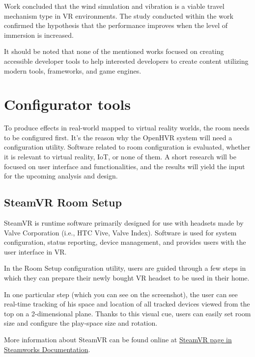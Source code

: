 Work concluded that the wind simulation and vibration is a viable travel
mechanism type in VR environments. The study conducted within
the work confirmed the hypothesis that the performance improves when the level of
immersion is increased.

\vspace{2em}

It should be noted that none of the mentioned works focused on
creating accessible developer tools to help interested developers to create
content utilizing modern tools, frameworks, and game engines.


\hypertarget{x-configurator-tools}{\section{Configurator tools}}
To produce effects in real-world mapped to virtual reality worlds,
the room needs to be configured first.
It’s the reason why the OpenHVR system will need a configuration utility.
Software related to room configuration is evaluated, whether it is relevant
to virtual reality, IoT, or none of them. A short research will be focused on 
user interface and functionalities, and the results will yield 
the input for the upcoming analysis and design.


\hypertarget{x-steamvr-room-setup}{\subsection{SteamVR Room Setup}}
SteamVR is runtime software primarily designed for use with headsets made
by Valve Corporation (i.e., HTC Vive, Valve Index). Software is used for
system configuration, status reporting, device management, and provides users
with the user interface in VR.\,\cite{steamvr}

In the Room Setup configuration utility, users are guided through a few steps
in which they can prepare their newly bought VR headset to be used in their
home.

In one particular step (which you can see on the screenshot), the user can see
real-time tracking of his space and location of all tracked devices viewed
from the top on a 2-dimensional plane. Thanks to this visual cue, users can
easily set room size and configure the play-space size and rotation.

More information about SteamVR can be found online at
\href{https://partner.steamgames.com/doc/features/steamvr/info}{SteamVR page in Steamworks Documentation}.

